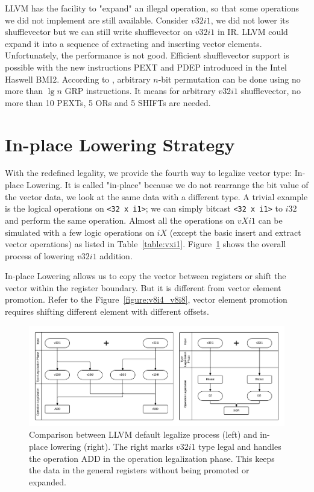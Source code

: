 LLVM has the facility to "expand" an illegal operation, so that some operations we did not implement are still available. Consider $v32i1$, we did not lower its shufflevector but we can still write shufflevector on $v32i1$ in IR\@. LLVM could expand it into a sequence of extracting and inserting vector elements. Unfortunately, the performance is not good. Efficient shufflevector support is possible with the new instructions PEXT and PDEP introduced in the Intel Haswell BMI2. According to \cite{lee2001efficient}, arbitrary $n$-bit permutation can be done using no more than $\lg n$ GRP instructions. It means for arbitrary $v32i1$ shufflevector, no more than 10 PEXTs, 5 ORs and 5 SHIFTs are needed.

\section{In-place Lowering Strategy}

With the redefined legality, we provide the fourth way to legalize vector type: In-place Lowering. It is called "in-place" because we do not rearrange the bit value of the vector data, we look at the same data with a different type. A trivial example is the logical operations on \verb|<32 x i1>|; we can simply bitcast \verb|<32 x i1>| to $i32$ and perform the same operation. Almost all the operations on $vXi1$ can be simulated with a few logic operations on $iX$ (except the basic insert and extract vector operations) as listed in Table~\ref{table:vxi1}. Figure~\ref{figure:v32i1_compare} shows the overall process of lowering $v32i1$ addition.

In-place Lowering allows us to copy the vector between registers or shift the vector within the register boundary. But it is different from vector element promotion. Refer to the Figure~\ref{figure:v8i4_v8i8}, vector element promotion requires shifting different element with different offsets.

\begin{figure}[ht!]
  \centering
  \includegraphics[width=150mm]{draw/v32i1_compare.png}
  \caption[Comparison between LLVM default legalize process and in-place lowering.]{Comparison between LLVM default legalize process (left) and in-place lowering (right). The right marks $v32i1$ type legal and handles the operation ADD in the operation legalization phase. This keeps the data in the general registers without being promoted or expanded.}
  \label{figure:v32i1_compare}
\end{figure}

